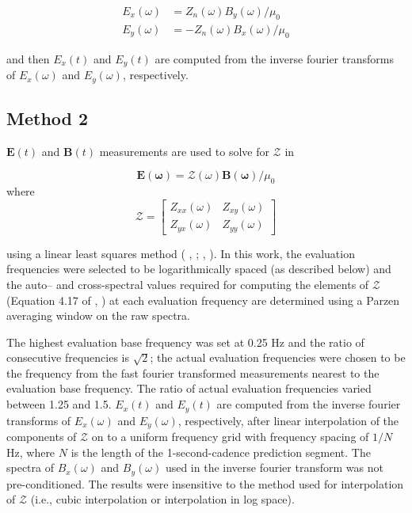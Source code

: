 \documentclass[linenumbers,draft]{agujournal}
\newcommand{\citeay}[1]{%
\citeauthor{#1}, \citeyear{#1}%
}
\begin{document}
\begin{equation}
\begin{split}
E_x(\omega) & = Z_n(\omega)B_y(\omega)/\mu_0\\
E_y(\omega) & = -Z_n(\omega)B_x(\omega)/\mu_0
\end{split}
\end{equation}

\noindent and then $E_x(t)$ and $E_y(t)$ are computed from the inverse fourier transforms of $E_x(\omega)$ and $E_y(\omega)$, respectively.

\subsection{Method 2}

$\mathbf{E}(t)$ and $\mathbf{B}(t)$ measurements are used to solve for $\mathcal{Z}$ in

\begin{equation}
\mathbf{E(\omega)} = \mathcal{Z(\omega)}\mathbf{B(\omega)}/\mu_0
\end{equation}
\noindent where
\begin{equation}
\mathcal{Z} = 
\begin{bmatrix}
Z_{xx}(\omega) & Z_{xy}(\omega)\\
Z_{yx}(\omega) & Z_{yy}(\omega)
\end{bmatrix}
\end{equation}

\noindent using a linear least squares method (\citeay{Sims1971}; \citeay{Simpson2005}).  In this work, the evaluation frequencies were selected to be logarithmically spaced (as described below) and the auto-- and cross-spectral values required for computing the elements of $\mathcal{Z}$ (Equation 4.17 of \citeay{Simpson2005}) at each evaluation frequency are determined using a Parzen averaging window on the raw spectra. 

The highest evaluation base frequency was set at 0.25 Hz and the ratio of consecutive frequencies is $\sqrt{2}$; the actual evaluation frequencies were chosen to be the frequency from the fast fourier transformed measurements nearest to the evaluation base frequency. The ratio of actual evaluation frequencies varied between 1.25 and 1.5.  $E_x(t)$ and $E_y(t)$ are computed from the inverse fourier transforms of $E_x(\omega)$ and $E_y(\omega)$, respectively, after linear interpolation of the components of $\mathcal{Z}$ on to a uniform frequency grid with frequency spacing of $1/N$ Hz, where $N$ is the length of the 1-second-cadence prediction segment.  The spectra of $B_x(\omega)$ and $B_y(\omega)$ used in the inverse fourier transform was not pre-conditioned.  The results were insensitive to the method used for interpolation of $\mathcal{Z}$ (i.e., cubic interpolation or interpolation in log space).
\end{document}
